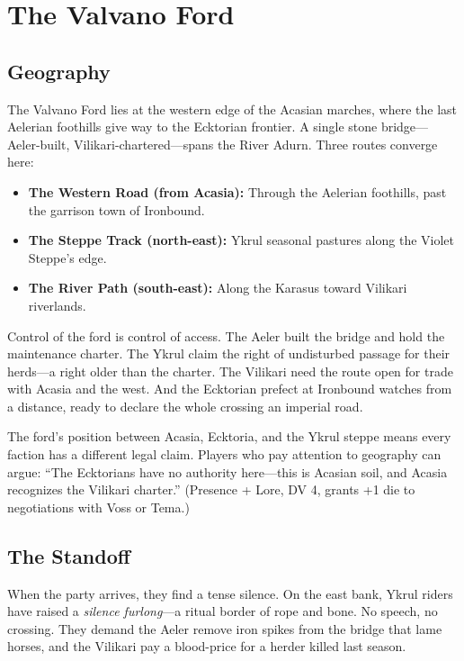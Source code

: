 \documentclass[10pt,twoside]{book}
\begin{document}

\chapter{The Valvano Ford}

\section{Geography}

The Valvano Ford lies at the western edge of the Acasian marches, where the last Aelerian foothills give way to the Ecktorian frontier. A single stone bridge---Aeler-built, Vilikari-chartered---spans the River Adurn. Three routes converge here:

\begin{itemize}
\item \textbf{The Western Road (from Acasia):} Through the Aelerian foothills, past the garrison town of Ironbound.
\item \textbf{The Steppe Track (north-east):} Ykrul seasonal pastures along the Violet Steppe's edge.
\item \textbf{The River Path (south-east):} Along the Karasus toward Vilikari riverlands.
\end{itemize}

Control of the ford is control of access. The Aeler built the bridge and hold the maintenance charter. The Ykrul claim the right of undisturbed passage for their herds---a right older than the charter. The Vilikari need the route open for trade with Acasia and the west. And the Ecktorian prefect at Ironbound watches from a distance, ready to declare the whole crossing an imperial road.

\begin{mechanicbox}
The ford's position between Acasia, Ecktoria, and the Ykrul steppe means every faction has a different legal claim. Players who pay attention to geography can argue: ``The Ecktorians have no authority here---this is Acasian soil, and Acasia recognizes the Vilikari charter.'' (Presence + Lore, DV 4, grants +1 die to negotiations with Voss or Tema.)
\end{mechanicbox}

\section{The Standoff}

When the party arrives, they find a tense silence. On the east bank, Ykrul riders have raised a \textit{silence furlong}---a ritual border of rope and bone. No speech, no crossing. They demand the Aeler remove iron spikes from the bridge that lame horses, and the Vilikari pay a blood-price for a herder killed last season.
\end{document}
